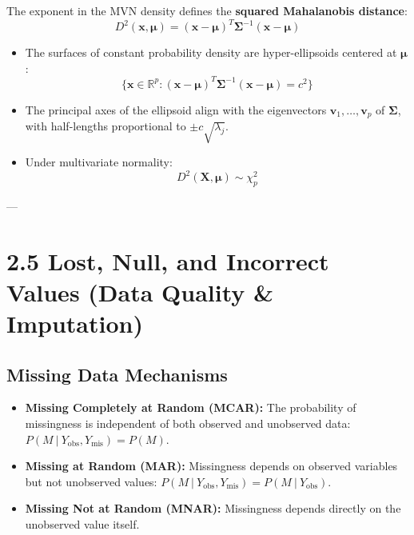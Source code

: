 \documentclass[
]{article}
\begin{document}
The exponent in the MVN density defines the \textbf{squared Mahalanobis
distance}:
\[D^{2}\left( \mathbf{x},\mathbf{\mu} \right) = \left( \mathbf{x} - \mathbf{\mu} \right)^{T}\mathbf{\Sigma}^{- 1}\left( \mathbf{x} - \mathbf{\mu} \right)\]

\begin{itemize}
\item
  The surfaces of constant probability density are hyper-ellipsoids
  centered at \(\mathbf{\mu}\):
  \[\{\mathbf{x} \in \mathbb{R}^{p}:\left( \mathbf{x} - \mathbf{\mu} \right)^{T}\mathbf{\Sigma}^{- 1}\left( \mathbf{x} - \mathbf{\mu} \right) = c^{2}\}\]
\item
  The principal axes of the ellipsoid align with the eigenvectors
  \(\mathbf{v}_{1},\ldots,\mathbf{v}_{p}\) of \(\mathbf{\Sigma}\), with
  half-lengths proportional to \(\pm c\sqrt{\lambda_{j}}\).
\item
  Under multivariate normality:
  \[D^{2}\left( \mathbf{X},\mathbf{\mu} \right) \sim \chi_{p}^{2}\]
\end{itemize}

---

\textbf{ }

\section{2.5 Lost, Null, and Incorrect Values (Data Quality \&
Imputation)}

\textbf{ }

\subsection{Missing Data Mechanisms}

\begin{itemize}
\item
  \textbf{Missing Completely at Random (MCAR):} The probability of
  missingness is independent of both observed and unobserved data:
  \(P\left( M~|~Y_{\text{obs}},Y_{\text{mis}} \right) = P(M)\).
\item
  \textbf{Missing at Random (MAR):} Missingness depends on observed
  variables but not unobserved values:
  \(P\left( M~|~Y_{\text{obs}},Y_{\text{mis}} \right) = P\left( M~|~Y_{\text{obs}} \right)\).
\item
  \textbf{Missing Not at Random (MNAR):} Missingness depends directly on
  the unobserved value itself.
\end{itemize}

\textbf{ }
\end{document}
